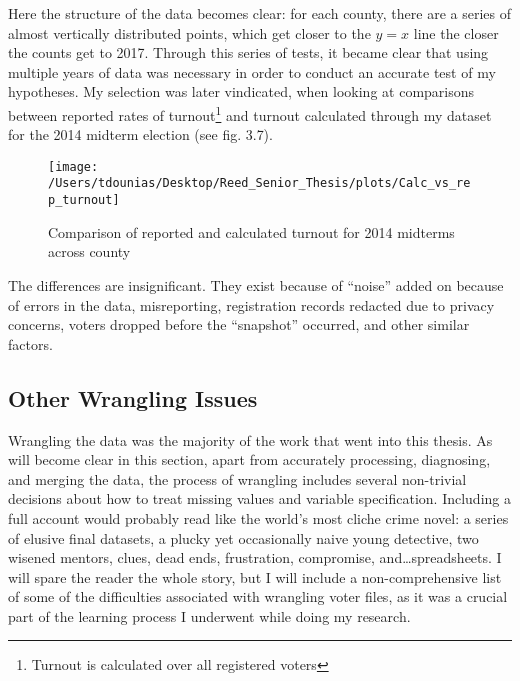 \documentclass[12pt,twoside]{reedthesis}
\begin{document}
  Here the structure of the data becomes clear: for each county, there are
  a series of almost vertically distributed points, which get closer to
  the \(y=x\) line the closer the counts get to 2017. Through this series
  of tests, it became clear that using multiple years of data was
  necessary in order to conduct an accurate test of my hypotheses. My
  selection was later vindicated, when looking at comparisons between
  reported rates of turnout\footnote{Turnout is calculated over all
    registered voters} and turnout calculated through my dataset for the
  2014 midterm election (see fig. 3.7).
  
  \begin{figure}
  
  {\centering \texttt{[image: /Users/tdounias/Desktop/Reed\_Senior\_Thesis/plots/Calc\_vs\_rep\_turnout]} 
  
  }
  
  \caption[Comparison of reported and calculated turnout for 2014 midterms across county]{Comparison of reported and calculated turnout for 2014 midterms across county}\label{fig:comp turnout 2014}
  \end{figure}
  
  The differences are insignificant. They exist because of ``noise'' added
  on because of errors in the data, misreporting, registration records
  redacted due to privacy concerns, voters dropped before the ``snapshot''
  occurred, and other similar factors.
  
  \subsection{Other Wrangling Issues}\label{other-wrangling-issues}
  
  Wrangling the data was the majority of the work that went into this
  thesis. As will become clear in this section, apart from accurately
  processing, diagnosing, and merging the data, the process of wrangling
  includes several non-trivial decisions about how to treat missing values
  and variable specification. Including a full account would probably read
  like the world's most cliche crime novel: a series of elusive final
  datasets, a plucky yet occasionally naive young detective, two wisened
  mentors, clues, dead ends, frustration, compromise,
  and\ldots{}spreadsheets. I will spare the reader the whole story, but I
  will include a non-comprehensive list of some of the difficulties
  associated with wrangling voter files, as it was a crucial part of the
  learning process I underwent while doing my research.
  
\end{document}
